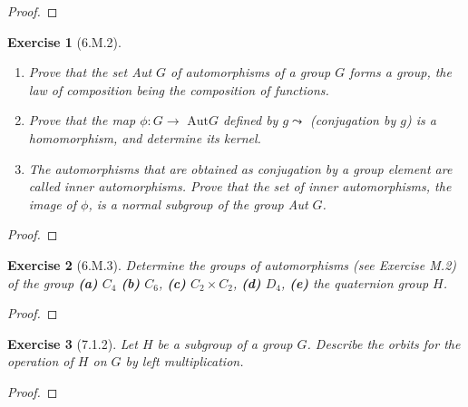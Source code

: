 \documentclass[12pt]{article}
\newtheorem*{exer}{Exercise}
\begin{document}
\begin{proof}

\end{proof}


\begin{exer}[6.M.2]
    \begin{enumerate}
        \item Prove that the set Aut $G$ of automorphisms of a group $G$
            forms a group, the law of composition being the composition
            of functions.
        \item Prove that the map $\phi : G \rightarrow \text{ Aut} G$
            defined by $g \leadsto$ (conjugation by $g$) is a
            homomorphism, and determine its kernel.
        \item The automorphisms that are obtained as conjugation by a
            group element are called inner automorphisms. Prove that the
            set of inner automorphisms, the image of $\phi$, is a normal
            subgroup of the group Aut $G$.
    \end{enumerate}
\end{exer}

\begin{proof}

\end{proof}


\begin{exer}[6.M.3]
    Determine the groups of automorphisms (see Exercise M.2) of the
    group \textbf{(a)} $C_4$ \textbf{(b)} $C_6$, \textbf{(c)} $C_2
    \times C_2$, \textbf{(d)} $D_4$, \textbf{(e)} the quaternion group
    $H$.
\end{exer}

\begin{proof}

\end{proof}


\begin{exer}[7.1.2]
    Let $H$ be a subgroup of a group $G$. Describe the orbits for the
    operation of $H$ on $G$ by left multiplication.
\end{exer}

\begin{proof}

\end{proof}
\end{document}
